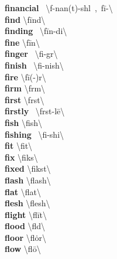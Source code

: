 \documentclass[10pt,a4paper]{article}
\begin{document}
\begin{multicols}{2}
\textbf{ financial }\quad \ \textbackslash f\textschwa -\textprimstress nan(t)-sh\textschwa l\ ,\ f\={i}-\textbackslash \\
\textbf{ find }\quad \textbackslash \textprimstress f\={i}nd\textbackslash \\
\textbf{ finding }\quad \ \textbackslash \textprimstress f\={i}n-di\engma \textbackslash \\
\textbf{ fine }\quad \textbackslash \textprimstress f\={i}n\textbackslash \\
\textbf{ finger }\quad \ \textbackslash \textprimstress fi\engma -g\textschwa r\textbackslash \\
\textbf{ finish }\quad \ \textbackslash \textprimstress fi-nish\textbackslash \\
\textbf{ fire }\quad \textbackslash \textprimstress f\={i}(-\textschwa )r\textbackslash \\
\textbf{ firm }\quad \textbackslash \textprimstress f\textschwa rm\textbackslash \\
\textbf{ first }\quad \textbackslash \textprimstress f\textschwa rst\textbackslash \\
\textbf{ firstly }\quad \ \textbackslash \textprimstress f\textschwa rst-l\={e}\textbackslash \\
\textbf{ fish }\quad \textbackslash \textprimstress fish\textbackslash \\
\textbf{ fishing }\quad \ \textbackslash \textprimstress fi-shi\engma \textbackslash \\
\textbf{ fit }\quad \textbackslash \textprimstress fit\textbackslash \\
\textbf{ fix }\quad \textbackslash \textprimstress fiks\textbackslash \\
\textbf{ fixed }\quad \textbackslash \textprimstress fikst\textbackslash \\
\textbf{ flash }\quad \textbackslash \textprimstress flash\textbackslash \\
\textbf{ flat }\quad \textbackslash \textprimstress flat\textbackslash \\
\textbf{ flesh }\quad \textbackslash \textprimstress flesh\textbackslash \\
\textbf{ flight }\quad \textbackslash \textprimstress fl\={i}t\textbackslash \\
\textbf{ flood }\quad \textbackslash \textprimstress fl\textschwa d\textbackslash \\
\textbf{ floor }\quad \textbackslash \textprimstress fl\.{o}r\textbackslash \\
\textbf{ flow }\quad \textbackslash \textprimstress fl\={o}\textbackslash \\

\end{multicols}
\end{document}
